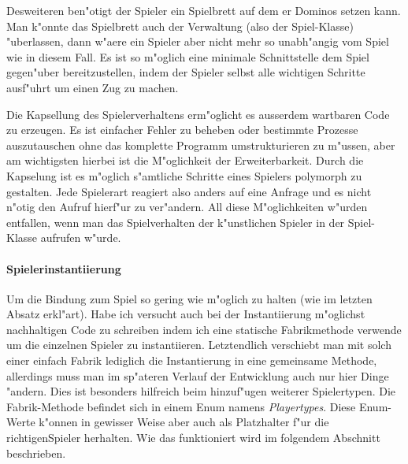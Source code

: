 Desweiteren ben"otigt der Spieler ein Spielbrett auf dem er Dominos setzen kann. Man k"onnte das Spielbrett auch der Verwaltung (also der Spiel-Klasse) "uberlassen, dann w"aere ein Spieler aber nicht mehr so unabh"angig vom Spiel wie in diesem Fall. Es ist so m"oglich eine minimale Schnittstelle dem Spiel gegen"uber bereitzustellen, indem der Spieler selbst alle wichtigen Schritte ausf"uhrt um einen Zug zu machen. 

Die Kapsellung des Spielerverhaltens erm"oglicht es ausserdem wartbaren Code zu erzeugen. Es ist einfacher Fehler zu beheben oder bestimmte Prozesse auszutauschen ohne das komplette Programm umstrukturieren zu m"ussen, aber am wichtigsten hierbei ist die M"oglichkeit der Erweiterbarkeit. 
Durch die Kapselung ist es m"oglich s"amtliche Schritte eines Spielers polymorph zu gestalten. Jede Spielerart reagiert also anders auf eine Anfrage und es nicht n"otig den Aufruf hierf"ur zu ver"andern. All diese M"oglichkeiten w"urden entfallen, wenn man das Spielverhalten der k"unstlichen Spieler in der Spiel-Klasse aufrufen w"urde.

\paragraph{Spielerinstantiierung}
Um die Bindung zum Spiel so gering wie m"oglich zu halten (wie im letzten Absatz erkl"art). Habe ich versucht auch bei der Instantiierung m"oglichst nachhaltigen Code zu schreiben indem ich eine statische Fabrikmethode verwende um die einzelnen Spieler zu instantiieren. Letztendlich verschiebt man mit solch einer einfach Fabrik lediglich die Instantierung in eine gemeinsame Methode, allerdings muss man im sp"ateren Verlauf der Entwicklung auch nur hier Dinge "andern. Dies ist besonders hilfreich beim hinzuf"ugen weiterer Spielertypen. Die Fabrik-Methode befindet sich in einem Enum namens \emph{Playertypes}. Diese Enum-Werte k"onnen in gewisser Weise aber auch als Platzhalter f"ur die \glqq richtigen\grqq  Spieler herhalten. Wie das funktioniert wird im folgendem Abschnitt beschrieben. 

